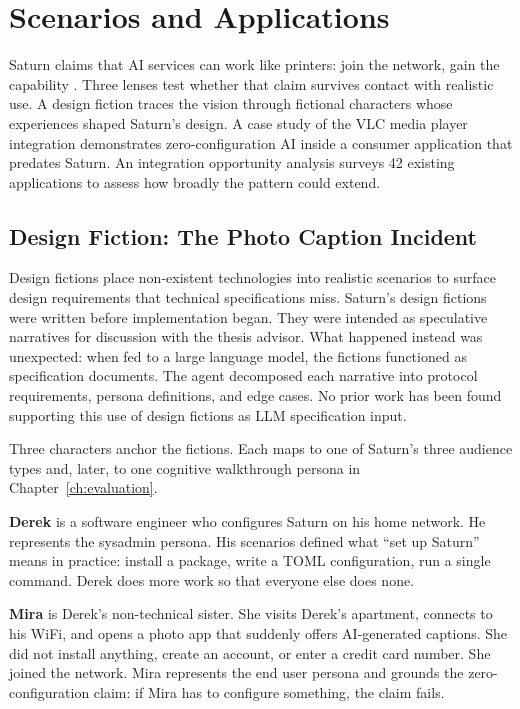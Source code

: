 \chapter{Scenarios and Applications}
\label{ch:scenarios}

Saturn claims that AI services can work like printers: join the network, gain the capability . Three lenses test whether that claim survives contact with realistic use. A design fiction traces the vision through fictional characters whose experiences shaped Saturn's design. A case study of the VLC media player integration demonstrates zero-configuration AI inside a consumer application that predates Saturn. An integration opportunity analysis surveys 42 existing applications to assess how broadly the pattern could extend.

\section{Design Fiction: The Photo Caption Incident}
\label{sec:design-fiction}

Design fictions place non-existent technologies into realistic scenarios to surface design requirements that technical specifications miss. Saturn's design fictions were written before implementation began. They were intended as speculative narratives for discussion with the thesis advisor. What happened instead was unexpected: when fed to a large language model, the fictions functioned as specification documents. The agent decomposed each narrative into protocol requirements, persona definitions, and edge cases. No prior work has been found supporting this use of design fictions as LLM specification input.

Three characters anchor the fictions. Each maps to one of Saturn's three audience types and, later, to one cognitive walkthrough persona in Chapter~\ref{ch:evaluation}.

\textbf{Derek} is a software engineer who configures Saturn on his home network. He represents the sysadmin persona. His scenarios defined what ``set up Saturn'' means in practice: install a package, write a TOML configuration, run a single command. Derek does more work so that everyone else does none.

\textbf{Mira} is Derek's non-technical sister. She visits Derek's apartment, connects to his WiFi, and opens a photo app that suddenly offers AI-generated captions. She did not install anything, create an account, or enter a credit card number. She joined the network. Mira represents the end user persona and grounds the zero-configuration claim: if Mira has to configure something, the claim fails.

